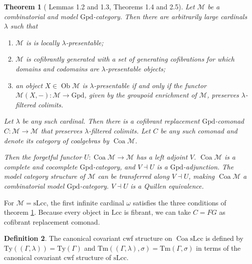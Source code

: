 \documentclass[a4paper]{article}
\newtheorem{theorem}{Theorem}
\theoremstyle{remark}
\theoremstyle{definition}
\newtheorem{definition}[theorem]{Definition}
\begin{document}
\begin{theorem}[\cite{coalgebraic-models} Lemmas 1.2 and 1.3, Theorems 1.4 and 2.5]
  \label{th:coalgebraic-model-category}
  Let $\mathcal{M}$ be a combinatorial and model $\mathrm{Gpd}$-category.
  Then there are arbitrarily large cardinals $\lambda$ such that
  \begin{enumerate}
    \item
      $\mathcal{M}$ is is locally $\lambda$-presentable;
    \item
      $\mathcal{M}$ is cofibrantly generated with a set of generating cofibrations for which domains and codomains are $\lambda$-presentable objects;
    \item
      an object $X \in \operatorname{Ob} \mathcal{M}$ is $\lambda$-presentable if and only if the functor $\mathcal{M}(X, -) : \mathcal{M} \rightarrow \mathrm{Gpd}$, given by the groupoid enrichment of $\mathcal{M}$, preserves $\lambda$-filtered colimits.
  \end{enumerate}

  Let $\lambda$ be any such cardinal.
  Then there is a cofibrant replacement $\mathrm{Gpd}$-comonad $C : \mathcal{M} \rightarrow \mathcal{M}$ that preserves $\lambda$-filtered colimits. 
  Let $C$ be any such comonad and denote its category of coalgebras by $\operatorname{Coa} \mathcal{M}$.

  Then the forgetful functor $U : \operatorname{Coa} \mathcal{M} \rightarrow \mathcal{M}$ has a left adjoint $V$.
  $\operatorname{Coa} \mathcal{M}$ is a complete and cocomplete $\mathrm{Gpd}$-category, and $V \dashv U$ is a $\mathrm{Gpd}$-adjunction.
  The model category structure of $\mathcal{M}$ can be transferred along $V \dashv U$, making $\operatorname{Coa} \mathcal{M}$ a combinatorial model $\mathrm{Gpd}$-category.
  $V \dashv U$ is a Quillen equivalence.
\end{theorem}

For $\mathcal{M} = \mathrm{sLcc}$, the first infinite cardinal $\omega$ satisfies the three conditions of theorem \ref{th:coalgebraic-model-category}.
Because every object in $\mathrm{Lcc}$ is fibrant, we can take $C = FG$ as cofibrant replacement comonad.

\begin{definition}
  The canonical covariant cwf structure on $\operatorname{Coa} \mathrm{sLcc}$ is defined by $\mathrm{Ty}((\Gamma, \lambda)) = \mathrm{Ty}(\Gamma)$ and $\mathrm{Tm}((\Gamma, \lambda), \sigma) = \mathrm{Tm}(\Gamma, \sigma)$ in terms of the canonical covariant cwf structure of $\mathrm{sLcc}$.
\end{definition}
\end{document}
